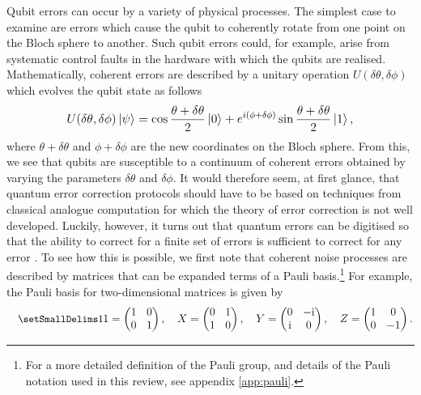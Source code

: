 \documentclass[]{arxiv}
\theoremstyle{plain}%
\theoremstyle{definition}
\theoremstyle{remark}
\DeclareRobustCommand\openone{\leavevmode\hbox{\small1\normalsize\kern-.33em1}}
\begin{document}
Qubit errors can occur by a variety of physical processes. The simplest case to examine are errors which cause the qubit to coherently rotate from one point on the Bloch sphere to another. Such qubit errors could, for example, arise from systematic control faults in the hardware with which the qubits are realised. Mathematically, coherent errors are described by a unitary operation $U(\delta\theta,\delta\phi)$ which evolves the qubit state as follows
%
\begin{equation}\label{eq:coherent_noise}
U(\delta\theta,\delta\phi)\ket{\psi}=\cos{\frac{\theta +\delta \theta}{2}}\ket{0}+e^{i(\phi +\delta \phi)}\sin{\frac{\theta+\delta\theta}{2}}\ket{1}\rm,
\end{equation}    
%
where $\theta +\delta \theta$ and $\phi +\delta \phi$ are the new coordinates on the Bloch sphere. From this, we see that qubits are susceptible to a continuum of coherent errors obtained by varying the parameters $\delta \theta $ and $\delta \phi$. It would therefore seem, at first glance, that quantum error correction protocols should have to be based on techniques from classical analogue computation for which the theory of error correction is not well developed. Luckily, however, it turns out that quantum errors can be digitised so that the ability to correct for a finite set of errors is sufficient to correct for any error \cite{Knill97}. To see how this is possible, we first note that coherent noise processes are described by matrices that can be expanded terms of a Pauli basis.\footnote{For a more detailed definition of the Pauli group, and details of the Pauli notation used in this review, see appendix \ref{app:pauli}.} For example, the Pauli basis for two-dimensional matrices is given by 
%
\begin{equation}
\openone=\left( \begin{matrix}
1 & 0 \\ 0 & 1
\end{matrix} \right), \quad X=\left( \begin{matrix}
0 & 1 \\ 1 & 0
\end{matrix} \right), \quad Y=\left( \begin{matrix}
0 & -{\rm i} \\ {\rm i}& 0
\end{matrix} \right),  \quad Z=\left( \begin{matrix}
1 & 0 \\ 0 & -1
\end{matrix} \right) \rm.
\end{equation}
\end{document}
